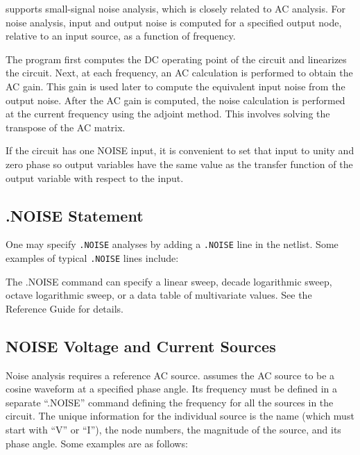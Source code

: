 \Xyce{} supports small-signal noise analysis, which is closely related to
AC analysis. For noise analysis, input and output noise is computed for a specified
output node, relative to an input source, as a function of frequency.  

The program first computes the DC operating point of the circuit and linearizes the circuit.
Next, at each frequency, an AC calculation is performed to obtain the AC gain.
This gain is used later to compute the equivalent input noise from the output noise.
After the AC gain is computed, the noise calculation is performed at the current 
frequency using the adjoint method.  This involves solving the transpose of the
AC matrix.


If the circuit has one NOISE input, it is convenient to set that input to unity
and zero phase so output variables have the same value as the transfer
function of the output variable with respect to the input. 

\subsection{.NOISE Statement}

One may specify \verb|.NOISE| analyses by adding a \verb|.NOISE| line in the netlist.  
Some examples of typical \verb|.NOISE| lines include:


The .NOISE command can specify a linear sweep, decade logarithmic sweep, octave logarithmic
sweep, or a data table of multivariate values. See the \Xyce{} Reference Guide\ReferenceGuide{}
for details.

\subsection{NOISE Voltage and Current Sources}
\label{NOISE_Sources}

Noise analysis requires a reference AC source.
\Xyce{} assumes the AC source to be a cosine waveform at a specified phase
angle. Its frequency must be defined in a separate ``.NOISE'' command defining
the frequency for all the sources in the circuit. The unique information for
the individual source is the name (which must start with ``V'' or ``I''),  the node
numbers, the magnitude of the source, and its phase angle. Some examples are as follows:


